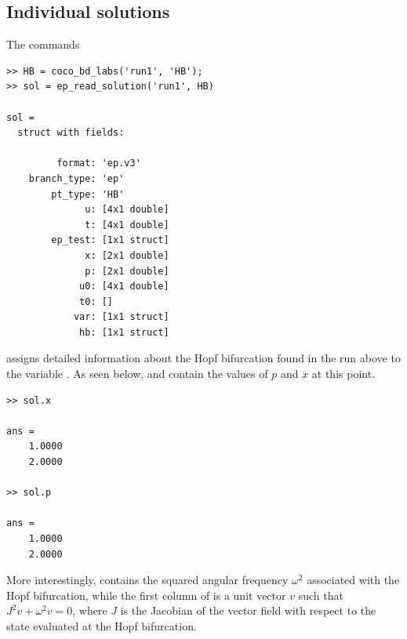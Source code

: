 \subsection{Individual solutions}
The commands
\begin{lstlisting}[language=coco-highlight,frame=lines]
>> HB = coco_bd_labs('run1', 'HB');
>> sol = ep_read_solution('run1', HB)

sol = 
  struct with fields:

         format: 'ep.v3'
    branch_type: 'ep'
        pt_type: 'HB'
              u: [4x1 double]
              t: [4x1 double]
        ep_test: [1x1 struct]
              x: [2x1 double]
              p: [2x1 double]
             u0: [4x1 double]
             t0: []
            var: [1x1 struct]
             hb: [1x1 struct]
\end{lstlisting}
assigns detailed information about the Hopf bifurcation found in the  run above to the variable . As seen below,  and  contain the values of $p$ and $x$ at this point. 
\begin{lstlisting}[language=coco-highlight,frame=lines]
>> sol.x

ans =
    1.0000
    2.0000
    
>> sol.p

ans =
    1.0000
    2.0000
\end{lstlisting}
More interestingly,  contains the squared angular frequency $\omega^2$ associated with the Hopf bifurcation, while the first column of  is a unit vector $v$ such that $J^2v+\omega^2v=0$, where $J$ is the Jacobian of the vector field with respect to the state evaluated at the Hopf bifurcation.

